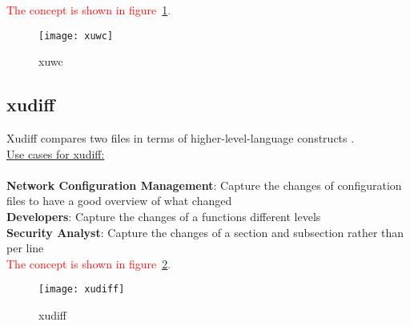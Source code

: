 \textcolor{red}{The concept is shown in figure~\ref{fig:xuwc}.}\\

\begin{center}
        \begin{figure}[h!]
          \centering
                \texttt{[image: xuwc]}
          \caption{xuwc}
          \label{fig:xuwc}
        \end{figure}
\end{center}
\newpage

\subsection{xudiff}

Xudiff compares two files in terms of higher-level-language constructs \cite{xutools01}.\\

\underline{Use cases for xudiff:} \\ \\

\textbf{Network Configuration Management}: Capture the changes of configuration files to have a good overview of what changed\\
\textbf{Developers}: Capture the changes of a functions different levels\\
\textbf{Security Analyst}: Capture the changes of a section and subsection rather than per line\\

\textcolor{red}{The concept is shown in figure~\ref{fig:xudiff}.}\\

\begin{center}
        \begin{figure}[h!]
          \centering
                \texttt{[image: xudiff]}
          \caption{xudiff}
          \label{fig:xudiff}
        \end{figure}
\end{center}

